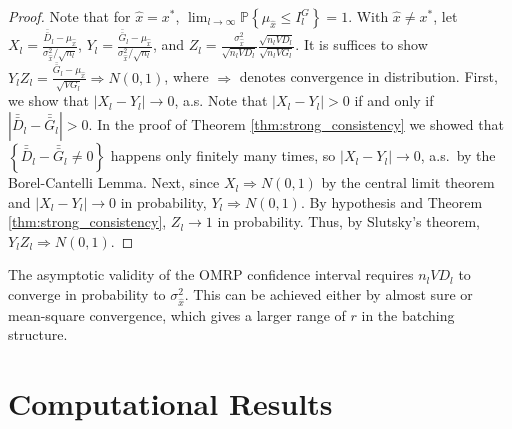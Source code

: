 \documentclass[12pt]{article}
\newcommand{\p}[1]{\mathbb{P} \left\{ #1 \right\}}
\newcommand{\x}{x}
\newcommand{\xh}{{\hat{\x}}}
\newcommand{\xs}{\x^*}
\newcommand{\gb}{\bar{G}}
\newcommand{\gbb}{\bar{\gb}}
\newcommand{\db}{\bar{D}}
\newcommand{\dbb}{\bar{\db}}
\begin{document}
\begin{proof}
	Note that for $\xh = \xs$, $\lim_{l\rightarrow\infty} \p{\mu_\xh \leq I^G_l} = 1$.  
        With $\xh \neq \xs$, let $X_l = \frac{\dbb_l - \mu_\xh}{\sigma^2_\xh/\sqrt{n_l}}$, $Y_l = \frac{\gbb_l - \mu_\xh}{\sigma^2_\xh/\sqrt{n_l}}$, and $Z_l = \frac{\sigma^2_\xh}{\sqrt{n_lVD_l}} \frac{\sqrt{n_lVD_l}}{\sqrt{n_lVG_l}}$.  
        It is suffices to show $Y_lZ_l = \frac{\gbb_l - \mu_\xh}{\sqrt{VG_l}} \Rightarrow N(0,1)$, where $\Rightarrow$ denotes convergence in distribution.  
        First, we show that $|X_l - Y_l| \rightarrow 0$, a.s.  Note that $|X_l - Y_l| > 0$ if and only if $|\dbb_l - \gbb_l| > 0$.  
        In the proof of Theorem \ref{thm:strong_consistency} we showed that $\left\{ \dbb_l - \gbb_l \neq 0 \right\}$ happens only finitely many times, so $|X_l - Y_l| \rightarrow 0$, a.s.\ by the Borel-Cantelli Lemma. 
        Next, since $X_l \Rightarrow N(0,1)$  by the central limit theorem and $|X_l - Y_l| \rightarrow 0$ in probability, $Y_l \Rightarrow N(0,1)$.  
        By hypothesis and Theorem \ref{thm:strong_consistency}, $Z_l \rightarrow 1$ in probability.  
        Thus, by Slutsky's theorem, $Y_lZ_l \Rightarrow N(0,1)$.
\end{proof}

The asymptotic validity of the OMRP confidence interval requires $n_l VD_l$ to converge in probability to $\sigma^{2}_{\xh}$. 
This can be achieved either by almost sure or mean-square convergence, which gives a larger range of $r$ in the batching structure.

\section{Computational Results}
\label{sec:comp}
\end{document}
